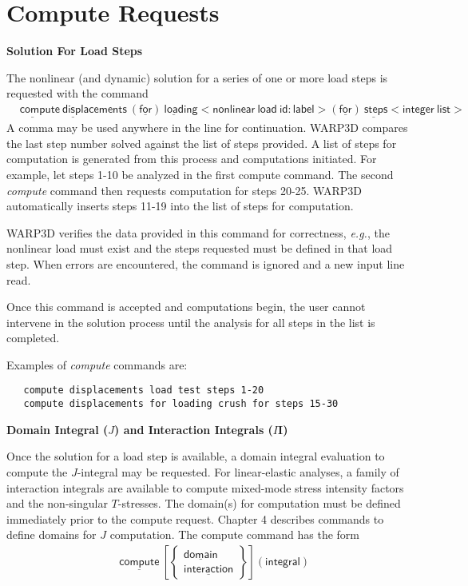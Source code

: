 \documentclass[11pt]{report}
\numberwithin{equation}{section}
\newcommand{\nin} {\noindent}
\newcommand{\ul} {\underline}
\newcommand{\hv} {\mathsf}   %
\newcommand{\eg}{\emph{e.g.},\xspace}
\newcommand{\ti}{\emph}
\begin{document}
\section{Compute Requests}

\noindent \bf{Solution For Load Steps}\rm

\nin The nonlinear (and dynamic) solution for a series of one or more load steps is requested with the command
\begin{align*}
& \hv{\ul{comp}ute\ \ul{displ}acements\ (\ul{for})\ \ul{load}ing<nonlinear\ load\ id: label>(\ul{for})\ \ul{step}s
<integer\ list>}
\end{align*}
\nin A comma may be used anywhere in the line for continuation. WARP3D 
compares the last step number solved against the list of steps provided. 
A list of steps for computation is generated from this process and computations 
initiated. For example, let steps 1-10 be analyzed in the first compute command. 
The second \ti{compute} command then requests computation for steps 20-25. 
WARP3D automatically inserts steps 11-19 into the list of steps for computation.

WARP3D verifies the data provided in this command for correctness, \eg the 
nonlinear load must exist and the steps requested must be defined in that 
load step. When errors are encountered, the command is ignored 
and a new input line read.

Once this command is accepted and computations begin, the user 
cannot intervene in the solution process until the analysis for 
all steps in the list is completed.

Examples of \ti{compute} commands are:
\small
\begin{verbatim}
   compute displacements load test steps 1-20
   compute displacements for loading crush for steps 15-30
\end{verbatim}
 \normalsize

\noindent \bf{Domain Integral ($J$) and Interaction Integrals ($I$I)}\rm

\nin Once the solution for a load step is available, a domain integral evaluation 
to compute the $J$-integral may be requested. For linear-elastic analyses, a 
family of interaction integrals are available to compute mixed-mode 
stress intensity factors and the non-singular $T$-stresses. The domain(s) 
for computation must be defined immediately prior to the compute request. 
Chapter 4 describes commands to define domains 
for $J$ computation. The compute command has the form
\begin{align*}
&\ \ \hv{\ul{compute}}\ \left [
\begin{Bmatrix}
\hv{  \ul{domain}} \\ \hv{\ul{interaction}} 
\end{Bmatrix}
\right ] \hv{(integral)}
\end{align*}

\end{document}
